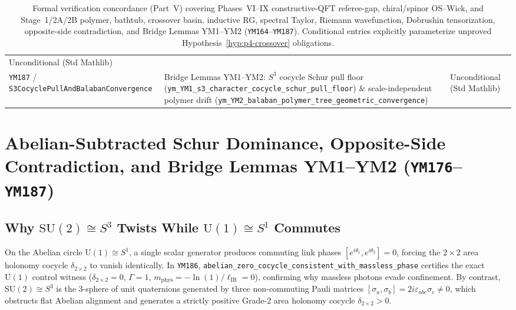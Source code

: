 \documentclass[11pt,a4paper]{article}
\newcommand{\SU}{\mathrm{SU}}
\begin{document}
\begin{table}[ht]
\begin{tabular}{@{}p{4.3cm}p{6.6cm}p{3.4cm}@{}}
Unconditional (Std Mathlib) \\
\texttt{YM187} / \texttt{S3CocyclePullAnd\allowbreak BalabanConvergence} &
Bridge Lemmas YM1--YM2: $S^3$ cocycle Schur pull floor (\texttt{ym\_\allowbreak YM1\_\allowbreak s3\_\allowbreak character\_\allowbreak cocycle\_\allowbreak schur\_\allowbreak pull\_\allowbreak floor}) \& scale-independent polymer drift (\texttt{ym\_\allowbreak YM2\_\allowbreak balaban\_\allowbreak polymer\_\allowbreak tree\_\allowbreak geometric\_\allowbreak convergence}) &
Unconditional (Std Mathlib) \\
\hline
\end{tabular}
\caption{Formal verification concordance (Part~V) covering Phases~VI--IX constructive-QFT referee-gap, chiral/spinor OS--Wick, and Stage~1/2A/2B polymer, bathtub, crossover basin, inductive RG, spectral Taylor, Riemann wavefunction, Dobrushin tensorization, opposite-side contradiction, and Bridge Lemmas YM1--YM2 (\texttt{YM164}--\texttt{YM187}). Conditional entries explicitly parameterize unproved Hypothesis~\ref{hyp:p4-crossover} obligations.}
\label{tab:paper4-concordance-phase456}
\end{table}

\section{Abelian-Subtracted Schur Dominance, Opposite-Side Contradiction, and Bridge Lemmas YM1--YM2 (\texttt{YM176}--\texttt{YM187})}
\label{sec:ym176-187-synthesis}

\subsection{Why $\SU(2) \cong S^3$ Twists While $\mathrm{U}(1) \cong S^1$ Commutes}
On the Abelian circle $\mathrm{U}(1) \cong S^1$, a single scalar generator produces commuting link phases $[e^{i\theta_1}, e^{i\theta_2}] = 0$, forcing the $2\times 2$ area holonomy cocycle $\delta_{2\times 2}$ to vanish identically. In \texttt{YM186}, \texttt{abelian\_\allowbreak zero\_\allowbreak cocycle\_\allowbreak consistent\_\allowbreak with\_\allowbreak massless\_\allowbreak phase} certifies the exact $\mathrm{U}(1)$ control witness ($\delta_{2\times 2} = 0$, $\Gamma = 1$, $m_{\mathrm{phys}} = -\ln(1)/\ell_{\mathrm{IR}} = 0$), confirming why massless photons evade confinement. By contrast, $\SU(2) \cong S^3$ is the $3$-sphere of unit quaternions generated by three non-commuting Pauli matrices $[\sigma_a, \sigma_b] = 2i\varepsilon_{abc}\sigma_c \ne 0$, which obstructs flat Abelian alignment and generates a strictly positive Grade-2 area holonomy cocycle $\delta_{2\times 2} > 0$.
\end{document}
